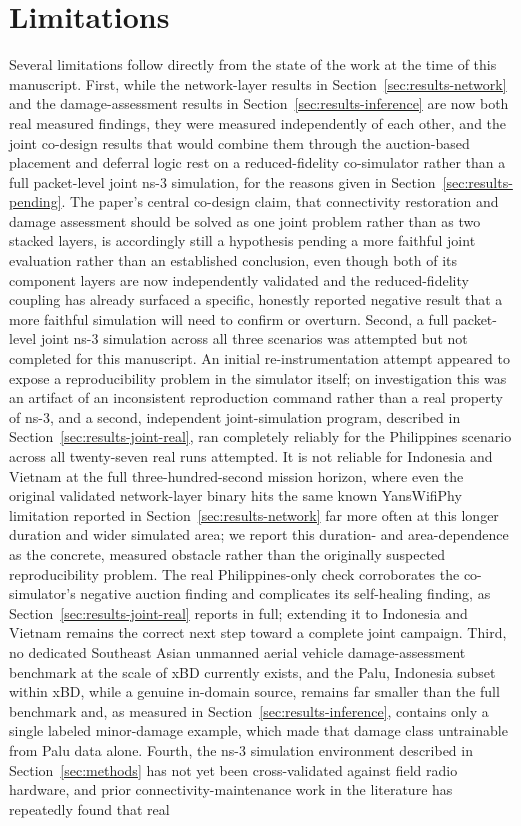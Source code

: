 \documentclass[drones,article,submit,moreauthors]{Definitions/mdpi}
\begin{document}
\section{Limitations}
\label{sec:limitations}

Several limitations follow directly from the state of the work at the time of this manuscript. First, while the network-layer results in Section~\ref{sec:results-network} and the damage-assessment results in Section~\ref{sec:results-inference} are now both real measured findings, they were measured independently of each other, and the joint co-design results that would combine them through the auction-based placement and deferral logic rest on a reduced-fidelity co-simulator rather than a full packet-level joint ns-3 simulation, for the reasons given in Section~\ref{sec:results-pending}. The paper's central co-design claim, that connectivity restoration and damage assessment should be solved as one joint problem rather than as two stacked layers, is accordingly still a hypothesis pending a more faithful joint evaluation rather than an established conclusion, even though both of its component layers are now independently validated and the reduced-fidelity coupling has already surfaced a specific, honestly reported negative result that a more faithful simulation will need to confirm or overturn. Second, a full packet-level joint ns-3 simulation across all three scenarios was attempted but not completed for this manuscript. An initial re-instrumentation attempt appeared to expose a reproducibility problem in the simulator itself; on investigation this was an artifact of an inconsistent reproduction command rather than a real property of ns-3, and a second, independent joint-simulation program, described in Section~\ref{sec:results-joint-real}, ran completely reliably for the Philippines scenario across all twenty-seven real runs attempted. It is not reliable for Indonesia and Vietnam at the full three-hundred-second mission horizon, where even the original validated network-layer binary hits the same known YansWifiPhy limitation reported in Section~\ref{sec:results-network} far more often at this longer duration and wider simulated area; we report this duration- and area-dependence as the concrete, measured obstacle rather than the originally suspected reproducibility problem. The real Philippines-only check corroborates the co-simulator's negative auction finding and complicates its self-healing finding, as Section~\ref{sec:results-joint-real} reports in full; extending it to Indonesia and Vietnam remains the correct next step toward a complete joint campaign. Third, no dedicated Southeast Asian unmanned aerial vehicle damage-assessment benchmark at the scale of xBD currently exists, and the Palu, Indonesia subset within xBD, while a genuine in-domain source, remains far smaller than the full benchmark and, as measured in Section~\ref{sec:results-inference}, contains only a single labeled minor-damage example, which made that damage class untrainable from Palu data alone. Fourth, the ns-3 simulation environment described in Section~\ref{sec:methods} has not yet been cross-validated against field radio hardware, and prior connectivity-maintenance work in the literature has repeatedly found that real 
\end{document}
